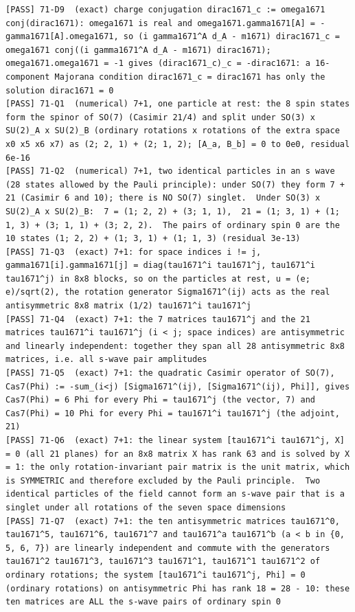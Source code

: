 \documentclass[
  10pt,
]{article}
\begin{document}
\begin{verbatim}
[PASS] 71-D9  (exact) charge conjugation dirac1671_c := omega1671 conj(dirac1671): omega1671 is real and omega1671.gamma1671[A] = -gamma1671[A].omega1671, so (i gamma1671^A d_A - m1671) dirac1671_c = omega1671 conj((i gamma1671^A d_A - m1671) dirac1671); omega1671.omega1671 = -1 gives (dirac1671_c)_c = -dirac1671: a 16-component Majorana condition dirac1671_c = dirac1671 has only the solution dirac1671 = 0
[PASS] 71-Q1  (numerical) 7+1, one particle at rest: the 8 spin states form the spinor of SO(7) (Casimir 21/4) and split under SO(3) x SU(2)_A x SU(2)_B (ordinary rotations x rotations of the extra space x0 x5 x6 x7) as (2; 2, 1) + (2; 1, 2); [A_a, B_b] = 0 to 0e0, residual 6e-16
[PASS] 71-Q2  (numerical) 7+1, two identical particles in an s wave (28 states allowed by the Pauli principle): under SO(7) they form 7 + 21 (Casimir 6 and 10); there is NO SO(7) singlet.  Under SO(3) x SU(2)_A x SU(2)_B:  7 = (1; 2, 2) + (3; 1, 1),  21 = (1; 3, 1) + (1; 1, 3) + (3; 1, 1) + (3; 2, 2).  The pairs of ordinary spin 0 are the 10 states (1; 2, 2) + (1; 3, 1) + (1; 1, 3) (residual 3e-13)
[PASS] 71-Q3  (exact) 7+1: for space indices i != j, gamma1671[i].gamma1671[j] = diag(tau1671^i tau1671^j, tau1671^i tau1671^j) in 8x8 blocks, so on the particles at rest, u = (e; e)/sqrt(2), the rotation generator Sigma1671^(ij) acts as the real antisymmetric 8x8 matrix (1/2) tau1671^i tau1671^j
[PASS] 71-Q4  (exact) 7+1: the 7 matrices tau1671^j and the 21 matrices tau1671^i tau1671^j (i < j; space indices) are antisymmetric and linearly independent: together they span all 28 antisymmetric 8x8 matrices, i.e. all s-wave pair amplitudes
[PASS] 71-Q5  (exact) 7+1: the quadratic Casimir operator of SO(7), Cas7(Phi) := -sum_(i<j) [Sigma1671^(ij), [Sigma1671^(ij), Phi]], gives Cas7(Phi) = 6 Phi for every Phi = tau1671^j (the vector, 7) and Cas7(Phi) = 10 Phi for every Phi = tau1671^i tau1671^j (the adjoint, 21)
[PASS] 71-Q6  (exact) 7+1: the linear system [tau1671^i tau1671^j, X] = 0 (all 21 planes) for an 8x8 matrix X has rank 63 and is solved by X = 1: the only rotation-invariant pair matrix is the unit matrix, which is SYMMETRIC and therefore excluded by the Pauli principle.  Two identical particles of the field cannot form an s-wave pair that is a singlet under all rotations of the seven space dimensions
[PASS] 71-Q7  (exact) 7+1: the ten antisymmetric matrices tau1671^0, tau1671^5, tau1671^6, tau1671^7 and tau1671^a tau1671^b (a < b in {0, 5, 6, 7}) are linearly independent and commute with the generators tau1671^2 tau1671^3, tau1671^3 tau1671^1, tau1671^1 tau1671^2 of ordinary rotations; the system [tau1671^i tau1671^j, Phi] = 0 (ordinary rotations) on antisymmetric Phi has rank 18 = 28 - 10: these ten matrices are ALL the s-wave pairs of ordinary spin 0

\end{verbatim}
\end{document}
